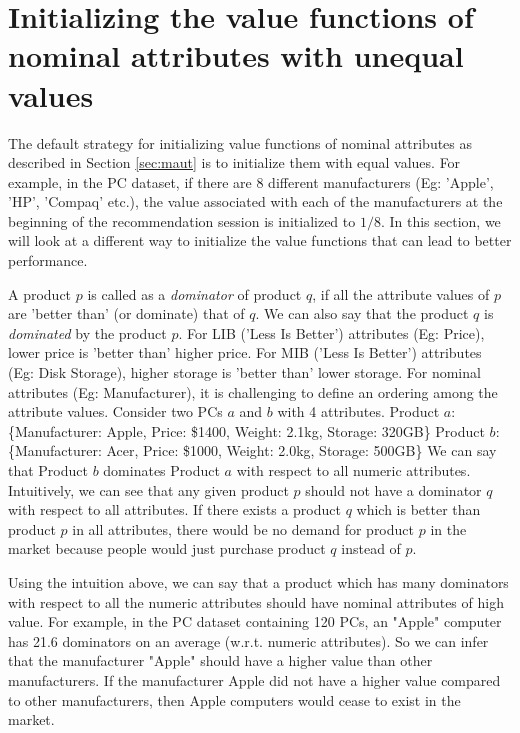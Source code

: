 \section{Initializing the value functions of nominal attributes with unequal values}
\label{sec:marketEq}
The default strategy for initializing value functions of nominal attributes as described in Section \ref{sec:maut} is to initialize them with equal values. 
For example, in the PC dataset, if there are 8 different manufacturers (Eg: 'Apple', 'HP', 'Compaq' etc.), the value associated with each of the manufacturers at the beginning of the recommendation session is initialized to $1/8$.
In this section, we will look at a different way to initialize the value functions that can lead to better performance.

A product $p$ is called as a \textit{dominator} of product $q$, if all the attribute values of  $p$ are 'better than' (or dominate) that of $q$. 
We can also say that the product $q$ is \textit{dominated} by the product $p$.
For LIB ('Less Is Better') attributes (Eg: Price), lower price is 'better than' higher price.
For MIB ('Less Is Better') attributes (Eg: Disk Storage), higher storage is 'better than' lower storage.
For nominal attributes (Eg: Manufacturer), it is challenging to define an ordering among the attribute values.
Consider two PCs $a$ and $b$ with 4 attributes.
Product $a$: \{Manufacturer: Apple, Price: \$1400, Weight: 2.1kg, Storage: 320GB\}
Product $b$: \{Manufacturer: Acer, Price: \$1000, Weight: 2.0kg, Storage: 500GB\}
We can say that Product $b$ dominates Product $a$ with respect to all numeric attributes.
Intuitively, we can see that any given product $p$ should not have a dominator $q$ with respect to all attributes.
If there exists a product $q$ which is better than product $p$ in all attributes, there would be no demand for product $p$ in the market because people would just purchase product $q$ instead of $p$.

Using the intuition above, we can say that a product which has many dominators with respect to all the numeric attributes should have nominal attributes of high value.
For example, in the PC dataset containing 120 PCs, an "Apple" computer has 21.6 dominators on an average (w.r.t. numeric attributes).
So we can infer that the manufacturer "Apple" should have a higher value than other manufacturers. 
If the manufacturer Apple did not have a higher value compared to other manufacturers, then Apple computers would cease to exist in the market.

